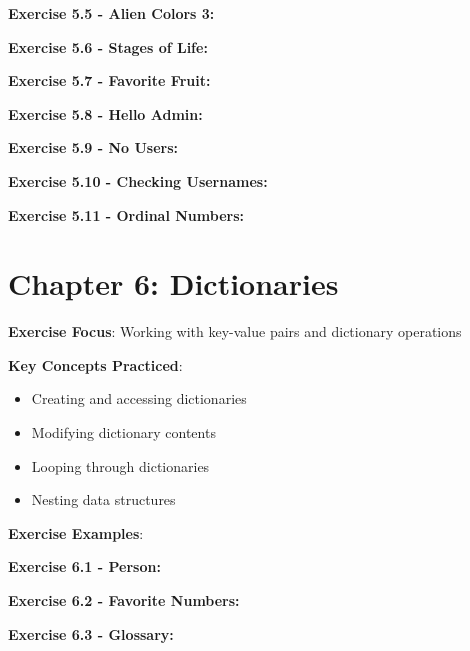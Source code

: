 \textbf{Exercise 5.5 - Alien Colors 3:}


\textbf{Exercise 5.6 - Stages of Life:}


\textbf{Exercise 5.7 - Favorite Fruit:}


\textbf{Exercise 5.8 - Hello Admin:}


\textbf{Exercise 5.9 - No Users:}


\textbf{Exercise 5.10 - Checking Usernames:}


\textbf{Exercise 5.11 - Ordinal Numbers:}


\section*{Chapter 6: Dictionaries}
\textbf{Exercise Focus}: Working with key-value pairs and dictionary operations

\textbf{Key Concepts Practiced}:
\begin{itemize}
    \item Creating and accessing dictionaries
    \item Modifying dictionary contents
    \item Looping through dictionaries
    \item Nesting data structures
\end{itemize}

\textbf{Exercise Examples}:

\textbf{Exercise 6.1 - Person:}


\textbf{Exercise 6.2 - Favorite Numbers:}


\textbf{Exercise 6.3 - Glossary:}


